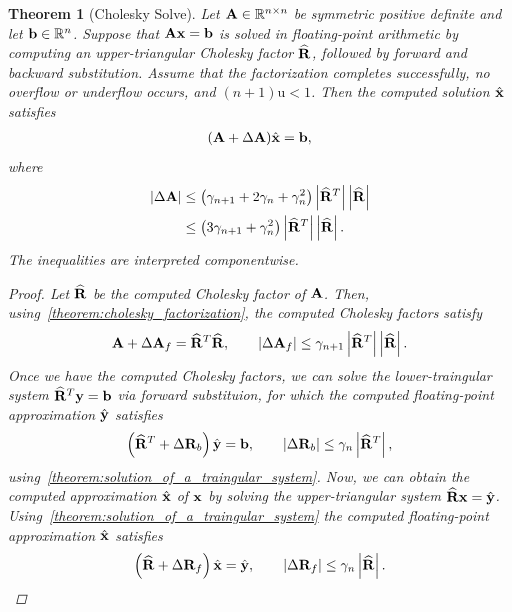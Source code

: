 \documentclass[11pt,draft]{article}
\newcommand{\urd}{\ensuremath{\mathrm{u}}}
\newcommand{\vect}[1]{\mathbf{\MakeLowercase{#1}}}
\newcommand{\mat}[1]{\mathbf{\MakeUppercase{#1}}}
\newcommand{\ireal}[1]{\in\mathbb{R}^{#1}}
\newtheorem{theorem}{Theorem}[section]
\theoremstyle{definition}
\theoremstyle{remark}
\newcommand{\abs}[1]{\left|#1\right|}
\begin{document}
\begin{theorem}[Cholesky Solve]\label{theorem:cholesky_solve}
Let $\mat{a}\ireal{n\times n}$ be symmetric positive definite and let
$\vect{b}\ireal{n}$. Suppose that $\mat{a}\vect{x}=\vect{b}$ is solved in
floating-point arithmetic by computing an upper-triangular Cholesky factor
$\widehat{\mat{r}}$, followed by forward and backward substitution. Assume
that the factorization completes successfully, no overflow or underflow
occurs, and $(n+1)\urd<1$. Then the computed solution
$\hat{\vect{x}}$ satisfies
\begin{align}
    (\mat{a}+\Delta\mat{a})\hat{\vect{x}}=\vect{b},
\end{align}
where
\begin{align}
    \abs{\Delta\mat{a}}
    &\leq
    \left(\gamma_{n+1}+2\gamma_n+\gamma_n^2\right)
    \abs{\widehat{\mat{r}}^T}\abs{\widehat{\mat{r}}}
    \\
    &\leq
    \left(3\gamma_{n+1}+\gamma_n^2\right)
    \abs{\widehat{\mat{r}}^T}\abs{\widehat{\mat{r}}}.
\end{align}
The inequalities are interpreted componentwise.
\begin{proof}
    Let $\widehat{\mat{r}}$ be the computed Cholesky factor of $\mat{a}$.
    Then, using~\cref{theorem:cholesky_factorization}, the computed Cholesky factors satisfy
    \begin{align}
        \mat{a} + \Delta \mat{a}_f = \widehat{\mat{r}}^T \widehat{\mat{r}}, \qquad \abs{\Delta \mat{a}_f} \leq \gamma_{n+1} \abs{\widehat{\mat{r}}^T}\abs{\widehat{\mat{r}}}.
    \end{align}
    Once we have the computed Cholesky factors, we can solve the lower-traingular system $\widehat{\mat{r}}^T\vect{y} = \vect{b}$ via forward substituion, for which the computed floating-point approximation $\hat{\vect{y}}$ satisfies
    \begin{align}
        \left(\widehat{\mat{r}}^T + \Delta \mat{r}_b\right)\hat{\vect{y}} = \vect{b}, \qquad \abs{\Delta \mat{r}_b} \leq \gamma_n \abs{\widehat{\mat{r}}^T},
    \end{align}
    using~\cref{theorem:solution_of_a_traingular_system}.
    Now, we can obtain the computed approximation $\hat{\vect{x}}$ of $\vect{x}$ by solving the upper-triangular system $\widehat{\mat{r}}\vect{x} = \hat{\vect{y}}$.
    Using~\cref{theorem:solution_of_a_traingular_system} the computed floating-point approximation $\hat{\vect{x}}$ satisfies 
    \begin{align}
        \left(\widehat{\mat{r}} + \Delta \mat{r}_f\right)\hat{\vect{x}} = \hat{\vect{y}}, \qquad \abs{\Delta \mat{r}_f} \leq \gamma_n \abs{\widehat{\mat{r}}}.

\end{align}
\end{proof}
\end{theorem}
\end{document}
